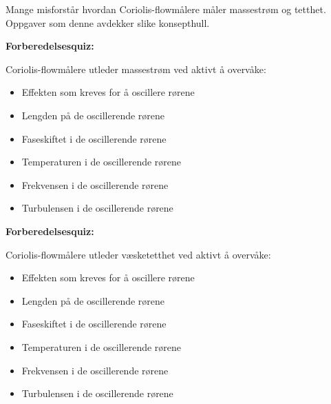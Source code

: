 





Mange misforstår hvordan Coriolis-flowmålere måler massestrøm og tetthet. Oppgaver som denne avdekker slike konsepthull.

\vfil \eject

\noindent
{\bf Forberedelsesquiz:}

Coriolis-flowmålere utleder massestrøm ved aktivt å overvåke:

\begin{itemize}
\item{} Effekten som kreves for å oscillere rørene
\vskip 5pt
\item{} Lengden på de oscillerende rørene
\vskip 5pt
\item{} Faseskiftet i de oscillerende rørene
\vskip 5pt
\item{} Temperaturen i de oscillerende rørene
\vskip 5pt
\item{} Frekvensen i de oscillerende rørene
\vskip 5pt
\item{} Turbulensen i de oscillerende rørene
\end{itemize}

\vfil \eject

\noindent
{\bf Forberedelsesquiz:}

Coriolis-flowmålere utleder væsketetthet ved aktivt å overvåke:

\begin{itemize}
\item{} Effekten som kreves for å oscillere rørene
\vskip 5pt
\item{} Lengden på de oscillerende rørene
\vskip 5pt
\item{} Faseskiftet i de oscillerende rørene
\vskip 5pt
\item{} Temperaturen i de oscillerende rørene
\vskip 5pt
\item{} Frekvensen i de oscillerende rørene
\vskip 5pt
\item{} Turbulensen i de oscillerende rørene
\end{itemize}


